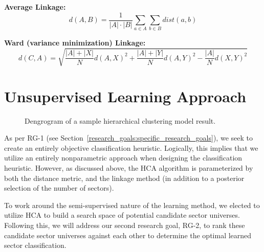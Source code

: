 \documentclass[../main.tex]{subfiles}
\begin{document}
\hspace{7em} \textbf{Average Linkage:}
        $$ d(A, B) = \frac{1}{|A| \cdot |B|} \sum_{a \in A} \sum_{b \in B} dist(a, b) $$
    
\hspace{7em} \textbf{Ward (variance minimization) Linkage:}
        $$ d(C, A) = \sqrt{ \frac{|A| + |X|}{N} d(A, X)^2 + \frac{|A| + |Y|}{N} d(A, Y)^2 - \frac{|A|}{N} d(X, Y)^2 } $$

\section{Unsupervised Learning Approach}

\begin{figure}
    \centering
    \vspace{\wrapfigadjustment}
    \caption{Dengrogram of a sample hierarchical clustering model result.}
    \label{fig:hierarchical_clustering_model:sample_dendogram}
\end{figure}

As per RG-1 (see Section~\ref{research_goals:specific_research_goals}), we seek to create an entirely objective classification heuristic. Logically, this implies that we utilize an entirely nonparametric approach when designing the classification heuristic. However, as discussed above, the HCA algorithm is parameterized by both the distance metric, and the linkage method (in addition to a posterior selection of the number of sectors).

To work around the semi-supervised nature of the learning method, we elected to utilize HCA to build a search space of potential candidate sector universes. Following this, we will address our second research goal, RG-2, to rank these candidate sector universes against each other to determine the optimal learned sector classification.
\end{document}
